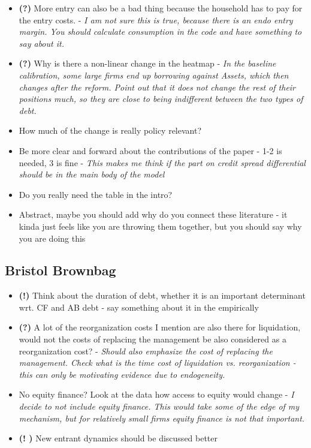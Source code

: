 \documentclass[12pt]{article}
\begin{document}
\begin{itemize}
    \item \textbf{(?)} More entry can also be a bad thing because the household has to pay for the entry costs. - \textit{I am not sure this is true, because there is an endo entry margin. You should calculate consumption in the code and have something to say about it.}
    \item \textbf{(?)} Why is there a non-linear change in the heatmap - \textit{In the baseline calibration, some large firms end up borrowing against Assets, which then changes after the reform. Point out that it does not change the rest of their positions much, so they are close to being indifferent between the two types of debt. }
    \item How much of the change is really policy relevant?
    \item Be more clear and forward about the contributions of the paper - 1-2 is needed, 3 is fine - \textit{This makes me think if the part on credit spread differential should be in the main body of the model}
    \item Do you really need the table in the intro? 
        \item Abstract, maybe you should add why do you connect these literature - it kinda just feels like you are throwing them together, but you should say why you are doing this
\end{itemize} \normalsize


\subsection*{Bristol Brownbag}
\begin{itemize}
    \item \textbf{(!)} Think about the duration of debt, whether it is an important determinant wrt. CF and AB debt - say something about it in the empirically
    \item \textbf{(?)} A lot of the reorganization costs I mention are also there for liquidation, would not the costs of replacing the management be also considered as a reorganization cost? - \textit{Should also emphasize the cost of replacing the management. Check what is the time cost of liquidation vs. reorganization - this can only be motivating evidence due to endogeneity.}
    \item No equity finance? Look at the data how access to equity would change - \textit{I decide to not include equity finance. This would take some of the edge of my mechanism, but for relatively small firms equity finance is not that important.}
    \item \textbf{(! \checkmark)} New entrant dynamics should be discussed better
\end{itemize}
\end{document}
